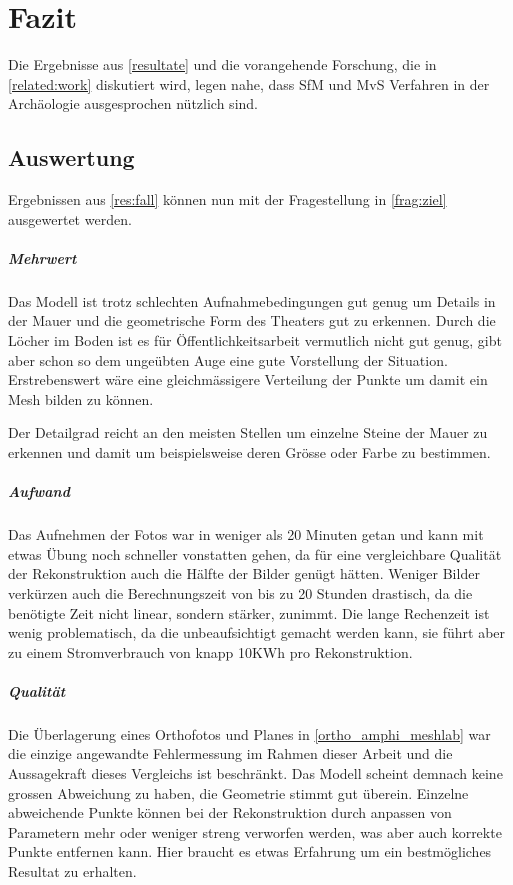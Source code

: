 \chapter{Fazit}
	Die Ergebnisse aus \autoref{resultate} und die vorangehende Forschung, die in \autoref{related:work} diskutiert wird, legen nahe, dass SfM und MvS Verfahren in der Archäologie ausgesprochen nützlich sind.
	
	\section{Auswertung}	
		Ergebnissen aus \autoref{res:fall} können nun mit der Fragestellung in \autoref{frag:ziel} ausgewertet werden.
		
		\paragraph{Mehrwert}
			Das Modell ist trotz schlechten Aufnahmebedingungen gut genug um Details in der Mauer und die geometrische Form des Theaters gut zu erkennen.
			Durch die Löcher im Boden ist es für Öffentlichkeitsarbeit vermutlich nicht gut genug, gibt aber schon so dem ungeübten Auge eine gute Vorstellung der Situation.
			Erstrebenswert wäre eine gleichmässigere Verteilung der Punkte um damit ein Mesh bilden zu können.
			
			Der Detailgrad reicht an den meisten Stellen um einzelne Steine der Mauer zu erkennen und damit um beispielsweise deren Grösse oder Farbe zu bestimmen.
						
		\paragraph{Aufwand}
			Das Aufnehmen der Fotos war in weniger als 20 Minuten getan und kann mit etwas Übung noch schneller vonstatten gehen, da für eine vergleichbare Qualität der Rekonstruktion auch die Hälfte der Bilder genügt hätten.
			Weniger Bilder verkürzen auch die Berechnungszeit von bis zu 20 Stunden drastisch, da die benötigte Zeit nicht linear, sondern stärker, zunimmt.
			Die lange Rechenzeit ist wenig problematisch, da die unbeaufsichtigt gemacht werden kann, sie führt aber zu einem Stromverbrauch von knapp 10KWh pro Rekonstruktion.
						
		\paragraph{Qualität}
			Die Überlagerung eines Orthofotos und Planes in \autoref{ortho_amphi_meshlab} war die einzige angewandte Fehlermessung im Rahmen dieser Arbeit und die Aussagekraft dieses Vergleichs ist beschränkt. Das Modell scheint demnach keine grossen Abweichung zu haben, die Geometrie stimmt gut überein.
			Einzelne abweichende Punkte können bei der Rekonstruktion durch anpassen von Parametern mehr oder weniger streng verworfen werden, was aber auch korrekte Punkte entfernen kann. Hier braucht es etwas Erfahrung um ein bestmögliches Resultat zu erhalten.
			
